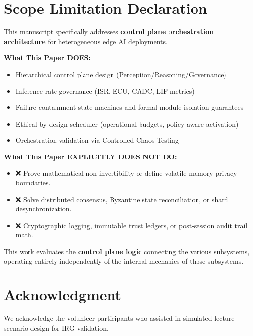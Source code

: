 \documentclass[conference]{IEEEtran}
\begin{document}
\section*{Scope Limitation Declaration}

This manuscript specifically addresses \textbf{control plane orchestration architecture} for heterogeneous edge AI deployments.

\textbf{What This Paper DOES:}
\begin{itemize}
    \item Hierarchical control plane design (Perception/Reasoning/Governance)
    \item Inference rate governance (ISR, ECU, CADC, LIF metrics)
    \item Failure containment state machines and formal module isolation guarantees
    \item Ethical-by-design scheduler (operational budgets, policy-aware activation)
    \item Orchestration validation via Controlled Chaos Testing
\end{itemize}

\textbf{What This Paper EXPLICITLY DOES NOT DO:}
\begin{itemize}
    \item ❌ Prove mathematical non-invertibility or define volatile-memory privacy boundaries.
    \item ❌ Solve distributed consensus, Byzantine state reconciliation, or shard desynchronization.
    \item ❌ Cryptographic logging, immutable trust ledgers, or post-session audit trail math.
\end{itemize}

This work evaluates the \textbf{control plane logic} connecting the various subsystems, operating entirely independently of the internal mechanics of those subsystems.

\section*{Acknowledgment}
We acknowledge the volunteer participants who assisted in simulated lecture scenario design for IRG validation.
\end{document}
